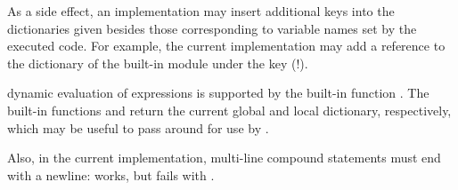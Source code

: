 As a side effect, an implementation may insert additional keys into
the dictionaries given besides those corresponding to variable names
set by the executed code.  For example, the current implementation
may add a reference to the dictionary of the built-in module
 under the key  (!).

dynamic evaluation of expressions is supported by the built-in
function .  The built-in functions
 and  return the current global
and local dictionary, respectively, which may be useful to pass around
for use by .

Also, in the current implementation, multi-line compound statements must
end with a newline:
 works, but
 fails with
.
  

